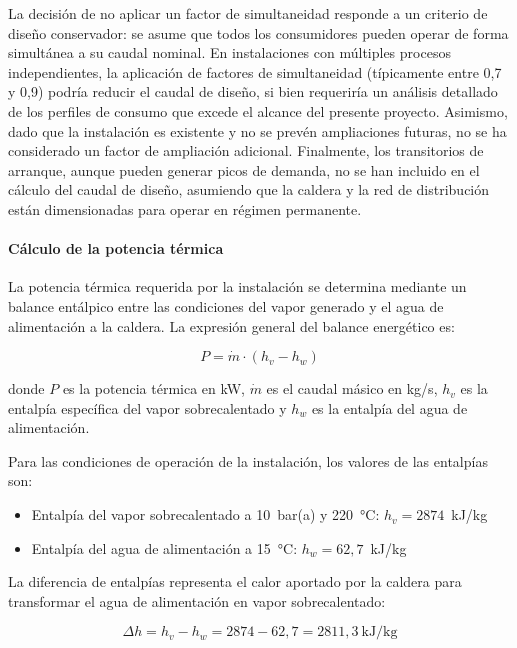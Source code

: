 \documentclass[12pt]{article}
\begin{document}
La decisión de no aplicar un factor de simultaneidad responde a un criterio de diseño conservador: se asume que todos los consumidores pueden operar de forma simultánea a su caudal nominal. En instalaciones con múltiples procesos independientes, la aplicación de factores de simultaneidad (típicamente entre 0,7 y 0,9) podría reducir el caudal de diseño, si bien requeriría un análisis detallado de los perfiles de consumo que excede el alcance del presente proyecto. Asimismo, dado que la instalación es existente y no se prevén ampliaciones futuras, no se ha considerado un factor de ampliación adicional. Finalmente, los transitorios de arranque, aunque pueden generar picos de demanda, no se han incluido en el cálculo del caudal de diseño, asumiendo que la caldera y la red de distribución están dimensionadas para operar en régimen permanente.

\paragraph{Cálculo de la potencia térmica}

La potencia térmica requerida por la instalación se determina mediante un balance entálpico entre las condiciones del vapor generado y el agua de alimentación a la caldera. La expresión general del balance energético es:

\begin{equation}
	P = \dot{m} \cdot (h_v - h_w)
	\label{eq:potencia-termica-balance}
\end{equation}

\noindent donde $P$ es la potencia térmica en kW, $\dot{m}$ es el caudal másico en kg/s, $h_v$ es la entalpía específica del vapor sobrecalentado y $h_w$ es la entalpía del agua de alimentación.

Para las condiciones de operación de la instalación, los valores de las entalpías son:

\begin{itemize}[leftmargin=2em]
	\item Entalpía del vapor sobrecalentado a 10~bar(a) y 220~°C: $h_v = 2874$~kJ/kg
	\item Entalpía del agua de alimentación a 15~°C: $h_w = 62{,}7$~kJ/kg
\end{itemize}

La diferencia de entalpías representa el calor aportado por la caldera para transformar el agua de alimentación en vapor sobrecalentado:

\begin{equation}
	\Delta h = h_v - h_w = 2874 - 62{,}7 = 2811{,}3 \ \text{kJ/kg}
	\label{eq:diferencia-entalpias}
\end{equation}
\end{document}

